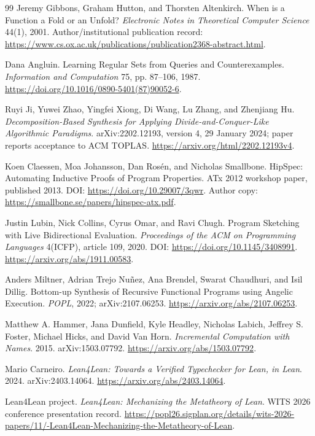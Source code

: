\documentclass[11pt,a4paper]{article}
\theoremstyle{definition}
\theoremstyle{remark}
\begin{document}
\begin{thebibliography}{99}
Jeremy Gibbons, Graham Hutton, and Thorsten Altenkirch.
When is a Function a Fold or an Unfold?
\emph{Electronic Notes in Theoretical Computer Science} 44(1), 2001.
Author/institutional publication record:
\url{https://www.cs.ox.ac.uk/publications/publication2368-abstract.html}.

Dana Angluin.
Learning Regular Sets from Queries and Counterexamples.
\emph{Information and Computation} 75, pp. 87--106, 1987.
\url{https://doi.org/10.1016/0890-5401(87)90052-6}.

Ruyi Ji, Yuwei Zhao, Yingfei Xiong, Di Wang, Lu Zhang, and Zhenjiang Hu.
\emph{Decomposition-Based Synthesis for Applying Divide-and-Conquer-Like Algorithmic Paradigms}.
arXiv:2202.12193, version 4, 29 January 2024; paper reports acceptance to ACM TOPLAS.
\url{https://arxiv.org/html/2202.12193v4}.

Koen Claessen, Moa Johansson, Dan Ros\'en, and Nicholas Smallbone.
HipSpec: Automating Inductive Proofs of Program Properties.
ATx 2012 workshop paper, published 2013. DOI: \url{https://doi.org/10.29007/3qwr}.
Author copy: \url{https://smallbone.se/papers/hipspec-atx.pdf}.

Justin Lubin, Nick Collins, Cyrus Omar, and Ravi Chugh.
Program Sketching with Live Bidirectional Evaluation.
\emph{Proceedings of the ACM on Programming Languages} 4(ICFP), article 109, 2020.
DOI: \url{https://doi.org/10.1145/3408991}.
\url{https://arxiv.org/abs/1911.00583}.

Anders Miltner, Adrian Trejo Nu\~nez, Ana Brendel, Swarat Chaudhuri, and Isil Dillig.
Bottom-up Synthesis of Recursive Functional Programs using Angelic Execution.
\emph{POPL}, 2022; arXiv:2107.06253.
\url{https://arxiv.org/abs/2107.06253}.

Matthew A. Hammer, Jana Dunfield, Kyle Headley, Nicholas Labich, Jeffrey S. Foster, Michael Hicks, and David Van Horn.
\emph{Incremental Computation with Names}.
2015. arXiv:1503.07792.
\url{https://arxiv.org/abs/1503.07792}.

Mario Carneiro.
\emph{Lean4Lean: Towards a Verified Typechecker for Lean, in Lean}.
2024. arXiv:2403.14064.
\url{https://arxiv.org/abs/2403.14064}.

Lean4Lean project. \emph{Lean4Lean: Mechanizing the Metatheory of Lean}.
WITS 2026 conference presentation record.
\url{https://popl26.sigplan.org/details/wits-2026-papers/11/-Lean4Lean-Mechanizing-the-Metatheory-of-Lean}.


\end{thebibliography}
\end{document}
